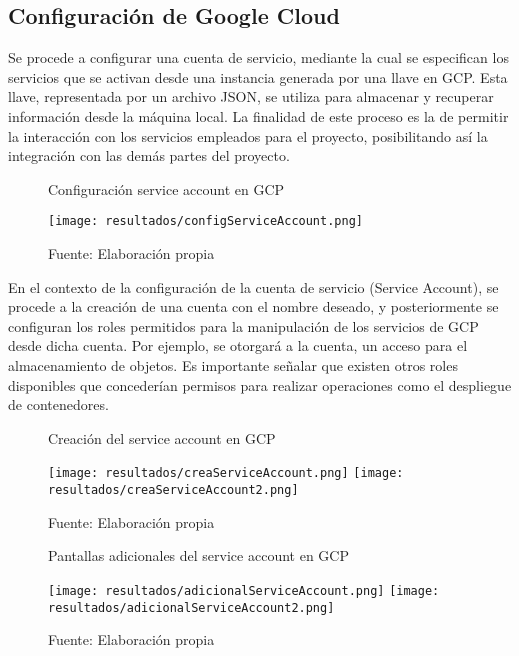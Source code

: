 \subsection{Configuración de Google Cloud}

Se procede a configurar una cuenta de servicio, mediante la cual se especifican los servicios que se activan desde una instancia generada por una llave en GCP. Esta llave, representada por un archivo JSON, se utiliza para almacenar y recuperar información desde la máquina local. La finalidad de este proceso es la de permitir la interacción con los servicios empleados para el proyecto, posibilitando así la integración con las demás partes del proyecto.

\begin{figure}[h]
	\centering
	\caption{Configuración service account en GCP}
	\texttt{[image: resultados/configServiceAccount.png]}
	\caption*{\footnotesize Fuente: Elaboración propia}
	\label{fig:figuraConfigServiceAccount}
\end{figure}

En el contexto de la configuración de la cuenta de servicio (Service Account), se procede a la creación de una cuenta con el nombre deseado, y posteriormente se configuran los roles permitidos para la manipulación de los servicios de GCP desde dicha cuenta. Por ejemplo, se otorgará a la cuenta, un acceso para el almacenamiento de objetos. Es importante señalar que existen otros roles disponibles que concederían permisos para realizar operaciones como el despliegue de contenedores.

\newpage

\begin{figure}[h]
	\centering
	\caption{Creación del service account en GCP}
	\texttt{[image: resultados/creaServiceAccount.png]}
	\texttt{[image: resultados/creaServiceAccount2.png]}
	\caption*{\footnotesize Fuente: Elaboración propia}
	\label{fig:figuraCreaServiceAccount}
\end{figure}

\newpage

\begin{figure}[h]
	\centering
	\caption{Pantallas adicionales del service account en GCP}
	\texttt{[image: resultados/adicionalServiceAccount.png]}
	\texttt{[image: resultados/adicionalServiceAccount2.png]}
	\caption*{\footnotesize Fuente: Elaboración propia}
	\label{fig:figuraAdicionalServiceAccount}
\end{figure}


